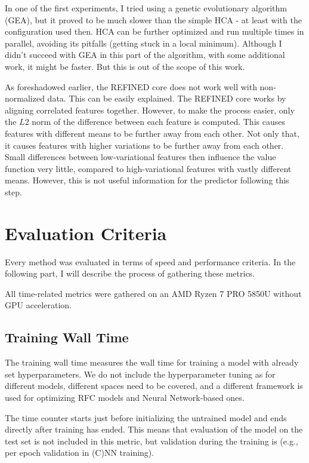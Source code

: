 In one of the first experiments, I tried using a genetic evolutionary algorithm (GEA), but it proved to be much slower than the simple HCA - at least with the configuration used then. HCA can be further optimized and run multiple times in parallel, avoiding its pitfalls (getting stuck in a local minimum). Although I didn't succeed with GEA in this part of the algorithm, with some additional work, it might be faster. But this is out of the scope of this work.

As foreshadowed earlier, the REFINED core does not work well with non-normalized data. This can be easily explained. The REFINED core works by aligning correlated features together. However, to make the process easier, only the $L2$ norm of the difference between each feature is computed. This causes features with different means to be further away from each other. Not only that, it causes features with higher variations to be further away from each other. Small differences between low-variational features then influence the value function very little, compared to high-variational features with vastly different means. However, this is not useful information for the predictor following this step.


\section{Evaluation Criteria}

Every method was evaluated in terms of speed and performance criteria. In the following part, I will describe the process of gathering these metrics.

All time-related metrics were gathered on an AMD Ryzen 7 PRO 5850U without GPU acceleration.

\subsection{Training Wall Time}

The training wall time measures the wall time for training a model with already set hyperparameters. We do not include the hyperparameter tuning as for different models, different spaces need to be covered, and a different framework is used for optimizing RFC models and Neural Network-based ones.

The time counter starts just before initializing the untrained model and ends directly after training has ended. This means that evaluation of the model on the test set is not included in this metric, but validation during the training is (e.g., per epoch validation in (C)NN training).

